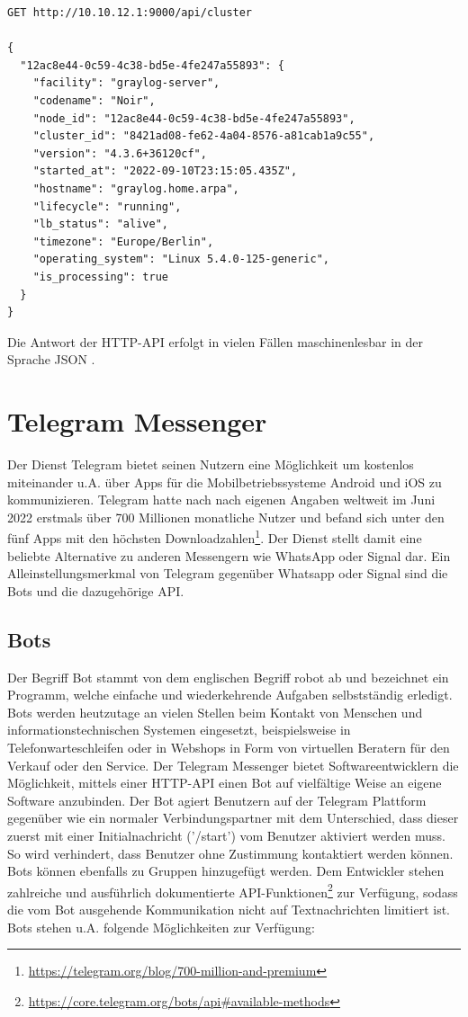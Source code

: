 \begin{lstlisting}[caption={Beispiel eines Aufrufs der Graylog REST-API.}, label=bsp-rest-api, numbers=none]
GET http://10.10.12.1:9000/api/cluster

{
  "12ac8e44-0c59-4c38-bd5e-4fe247a55893": {
    "facility": "graylog-server",
    "codename": "Noir",
    "node_id": "12ac8e44-0c59-4c38-bd5e-4fe247a55893",
    "cluster_id": "8421ad08-fe62-4a04-8576-a81cab1a9c55",
    "version": "4.3.6+36120cf",
    "started_at": "2022-09-10T23:15:05.435Z",
    "hostname": "graylog.home.arpa",
    "lifecycle": "running",
    "lb_status": "alive",
    "timezone": "Europe/Berlin",
    "operating_system": "Linux 5.4.0-125-generic",
    "is_processing": true
  }
}
\end{lstlisting}

Die Antwort der HTTP-API erfolgt in vielen Fällen maschinenlesbar in der Sprache JSON \cite[S. 281]{swdev}.

\section{Telegram Messenger}

Der Dienst Telegram bietet seinen Nutzern eine Möglichkeit um kostenlos miteinander u.A. über Apps für die Mobilbetriebssysteme Android und iOS zu kommunizieren. Telegram hatte nach nach eigenen Angaben weltweit im Juni 2022 erstmals über 700 Millionen monatliche Nutzer und befand sich unter den fünf Apps mit den höchsten Downloadzahlen\footnote{\url{https://telegram.org/blog/700-million-and-premium}}. Der Dienst stellt damit eine beliebte Alternative zu anderen Messengern wie WhatsApp oder Signal dar. Ein Alleinstellungsmerkmal von Telegram gegenüber Whatsapp oder Signal sind die Bots und die dazugehörige API.

\subsection{Bots}

Der Begriff Bot stammt von dem englischen Begriff robot ab und bezeichnet ein Programm, welche einfache und wiederkehrende Aufgaben selbstständig erledigt. Bots werden heutzutage an vielen Stellen beim Kontakt von Menschen und informationstechnischen Systemen eingesetzt, beispielsweise in Telefonwarteschleifen oder in Webshops in Form von virtuellen Beratern für den Verkauf oder den Service. Der Telegram Messenger bietet Softwareentwicklern die Möglichkeit, mittels einer HTTP-API einen Bot auf vielfältige Weise an eigene Software anzubinden. Der Bot agiert Benutzern auf der Telegram Plattform gegenüber wie ein normaler Verbindungspartner mit dem Unterschied, dass dieser zuerst mit einer Initialnachricht ('/start') vom Benutzer aktiviert werden muss. So wird verhindert, dass  Benutzer ohne Zustimmung kontaktiert werden können. Bots können ebenfalls zu Gruppen hinzugefügt werden. Dem Entwickler stehen zahlreiche und ausführlich dokumentierte API-Funktionen\footnote{\url{https://core.telegram.org/bots/api\#available-methods}} zur Verfügung, sodass die vom Bot ausgehende Kommunikation nicht auf Textnachrichten limitiert ist. Bots stehen u.A. folgende Möglichkeiten zur Verfügung:

